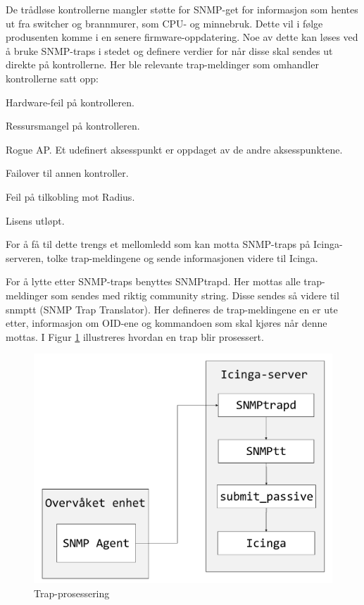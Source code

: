 De trådløse kontrollerne mangler støtte for SNMP-get for informasjon som hentes ut fra switcher og brannmurer, som CPU- og minnebruk. Dette vil i følge produsenten komme i en senere firmware-oppdatering. Noe av dette kan løses ved å bruke SNMP-traps i stedet og definere verdier for når disse skal sendes ut direkte på kontrollerne. Her ble relevante trap-meldinger som omhandler kontrollerne satt opp:
\begin{itemize*}
	\item Hardware-feil på kontrolleren.
	\item Ressursmangel på kontrolleren.
	\item Rogue AP. Et udefinert aksesspunkt er oppdaget av de andre aksesspunktene.
	\item Failover til annen kontroller.
	\item Feil på tilkobling mot Radius.
	\item Lisens utløpt.
\end{itemize*}

For å få til dette trengs et mellomledd som kan motta SNMP-traps på Icinga-serveren, tolke trap-meldingene og sende informasjonen videre til Icinga. 

For å lytte etter SNMP-traps benyttes SNMPtrapd\cite{snmptraps2}. Her mottas alle trap-meldinger som sendes med riktig community string. Disse sendes så videre til snmptt (SNMP Trap Translator\cite{traptranselator}). Her defineres de trap-meldingene en er ute etter, informasjon om OID-ene og kommandoen som skal kjøres når denne mottas. I Figur \ref{snmptrap} illustreres hvordan en trap blir prosessert. 

\begin{figure}[H]
    \centering
    \includegraphics[scale=0.4]{img/SNMPtrap}
    \caption{Trap-prosessering}
    \label{snmptrap}
\end{figure}

